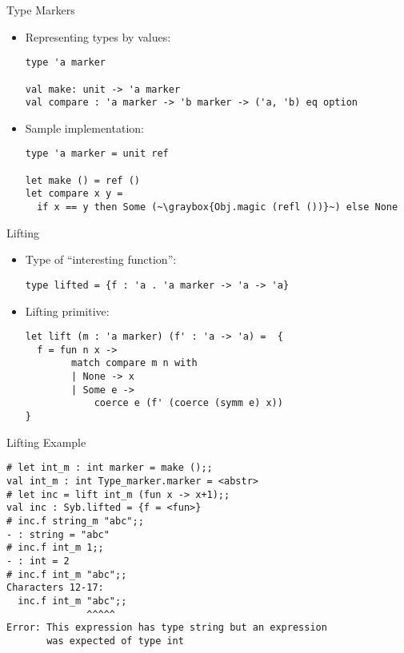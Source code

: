 \begin{frame}[fragile]{Type Markers}

\begin{itemize}
\item Representing types by values:
\begin{lstlisting}
type 'a marker

val make: unit -> 'a marker
val compare : 'a marker -> 'b marker -> ('a, 'b) eq option
\end{lstlisting}
\pause
\item Sample implementation:
\begin{lstlisting}
type 'a marker = unit ref

let make () = ref ()
let compare x y = 
  if x == y then Some (~\graybox{Obj.magic (refl ())}~) else None
\end{lstlisting}
\end{itemize}
\end{frame}

\begin{frame}[fragile]{Lifting}
\begin{itemize}
\item Type of ``interesting function'':
\begin{lstlisting}
type lifted = {f : 'a . 'a marker -> 'a -> 'a}
\end{lstlisting}
\pause
\item Lifting primitive:
\begin{lstlisting}
let lift (m : 'a marker) (f' : 'a -> 'a) =  {
  f = fun n x ->
        match compare m n with
        | None -> x
        | Some e ->        
            coerce e (f' (coerce (symm e) x))
}
\end{lstlisting}
\end{itemize}
\end{frame}

\begin{frame}[fragile]{Lifting Example}
\begin{verbatim}
# let int_m : int marker = make ();;     
val int_m : int Type_marker.marker = <abstr>
# let inc = lift int_m (fun x -> x+1);;
val inc : Syb.lifted = {f = <fun>}
# inc.f string_m "abc";;
- : string = "abc"
# inc.f int_m 1;;
- : int = 2
# inc.f int_m "abc";;
Characters 12-17:
  inc.f int_m "abc";;
              ^^^^^
Error: This expression has type string but an expression 
       was expected of type int 
\end{verbatim}
\end{frame}

